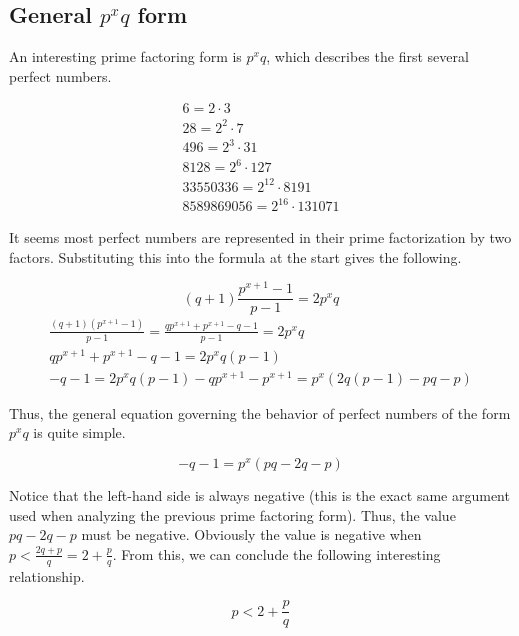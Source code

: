 \documentclass{article}
\begin{document}
\subsection{General \(p^x q\) form}

An interesting prime factoring form is \(p^x q\), which describes the first several perfect numbers.

\begin{align*}
    6 = 2 \cdot 3 \\
    28 = 2^2 \cdot 7 \\
    496 = 2^3 \cdot 31 \\
    8128 = 2^6 \cdot 127 \\
    33550336 = 2^{12} \cdot 8191 \\
    8589869056 = 2^{16} \cdot 131071
\end{align*}

It seems most perfect numbers are represented in their prime factorization by two factors. Substituting this into the formula at the start gives the following.

\begin{equation}
    (q + 1)\frac{p^{x + 1} - 1}{p - 1} = 2 p^x q
\end{equation}
\begin{align*}
    \frac{(q + 1)(p^{x + 1} - 1)}{p - 1} = \frac{qp^{x+1} + p^{x+1} - q - 1}{p - 1} = 2 p^x q \\
    qp^{x + 1} + p^{x + 1} - q - 1 = 2 p^x q (p - 1) \\
    -q - 1 = 2p^x q (p - 1) - qp^{x + 1} - p^{x + 1} = p^x \left ( 2q(p - 1) - pq - p\right )
\end{align*}

Thus, the general equation governing the behavior of perfect numbers of the form \(p^x q\) is quite simple.

\begin{equation}
    -q - 1 = p^x \left ( pq - 2q - p \right )
\end{equation}

Notice that the left-hand side is always negative (this is the exact same argument used when analyzing the previous prime factoring form). Thus, the value \(pq - 2q - p\) must be negative. Obviously the value is negative when \(p < \frac{2q + p}{q} = 2 + \frac{p}{q}\). From this, we can conclude the following interesting relationship.

\begin{equation}
    p < 2 + \frac{p}{q}
\end{equation}
\end{document}
